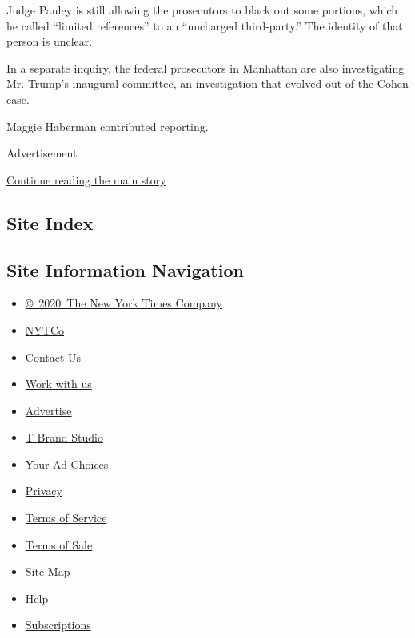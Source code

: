 Judge Pauley is still allowing the prosecutors to black out some
portions, which he called ``limited references'' to an ``uncharged
third-party.'' The identity of that person is unclear.

In a separate inquiry, the federal prosecutors in Manhattan are also
investigating Mr. Trump's inaugural committee, an investigation that
evolved out of the Cohen case.

Maggie Haberman contributed reporting.

Advertisement

\protect\hyperlink{after-bottom}{Continue reading the main story}

\hypertarget{site-index}{%
\subsection{Site Index}\label{site-index}}

\hypertarget{site-information-navigation}{%
\subsection{Site Information
Navigation}\label{site-information-navigation}}

\begin{itemize}
\tightlist
\item
  \href{https://help.nytimes.com/hc/en-us/articles/115014792127-Copyright-notice}{©~2020~The
  New York Times Company}
\end{itemize}

\begin{itemize}
\tightlist
\item
  \href{https://www.nytco.com/}{NYTCo}
\item
  \href{https://help.nytimes.com/hc/en-us/articles/115015385887-Contact-Us}{Contact
  Us}
\item
  \href{https://www.nytco.com/careers/}{Work with us}
\item
  \href{https://nytmediakit.com/}{Advertise}
\item
  \href{http://www.tbrandstudio.com/}{T Brand Studio}
\item
  \href{https://www.nytimes.com/privacy/cookie-policy\#how-do-i-manage-trackers}{Your
  Ad Choices}
\item
  \href{https://www.nytimes.com/privacy}{Privacy}
\item
  \href{https://help.nytimes.com/hc/en-us/articles/115014893428-Terms-of-service}{Terms
  of Service}
\item
  \href{https://help.nytimes.com/hc/en-us/articles/115014893968-Terms-of-sale}{Terms
  of Sale}
\item
  \href{https://spiderbites.nytimes.com}{Site Map}
\item
  \href{https://help.nytimes.com/hc/en-us}{Help}
\item
  \href{https://www.nytimes.com/subscription?campaignId=37WXW}{Subscriptions}
\end{itemize}
